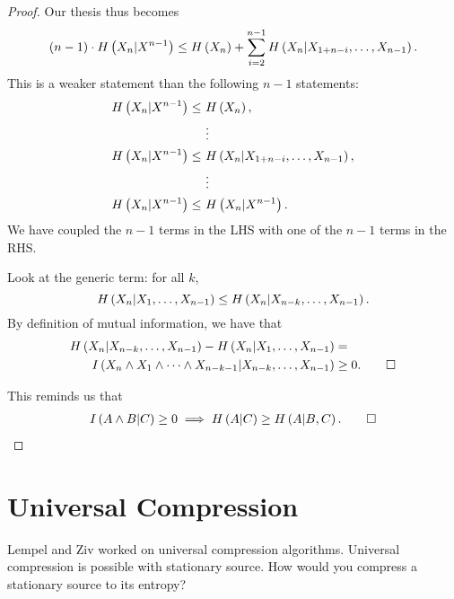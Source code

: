 \begin{proof}
	Our thesis thus becomes
	\begin{equation*}
		(n-1) \cdot H\left({X_n | X^{n-1}}\right)
		\le
		H\left({X_n}\right) + \sum_{i=2}^{n-1} H\left({X_n | X_{1+n-i}, \dots, X_{n-1}}\right).
	\end{equation*}
	This is a weaker statement than the following $n-1$ statements:
	\begin{align*}
		H\left({X_n | X^{n-1}}\right) \le~& H\left({X_n}\right),
		\\
		& \vdots
		\\
		H\left({X_n | X^{n-1}}\right) \le~& H\left({X_n | X_{1+n-i}, \dots, X_{n-1}}\right),
		\\
		& \vdots
		\\
		H\left({X_n | X^{n-1}}\right) \le~& H\left({X_n | X^{n-1}}\right).
	\end{align*}
	We have coupled the $n-1$ terms in the \ac{LHS} with one of the $n-1$ terms in the \ac{RHS}.

	Look at the generic term: for all $k$,
	\begin{equation*}
		H\left({X_n | X_1, \dots, X_{n-1}}\right)
		\le
		H\left({X_n | X_{n-k}, \dots, X_{n-1}}\right).
	\end{equation*}
	By definition of mutual information, we have that
	\begin{align*}
		H\left({X_n | X_{n-k}, \dots, X_{n-1}}\right)
		-
		H\left({X_n | X_1, \dots, X_{n-1}}\right)
		& =
		\\
		I \left( {X_n \land X_1 \land \dots \land X_{n-k-1} | X_{n-k}, \dots, X_{n-1}} \right)
		& \ge 0. \qedhere
	\end{align*}

	This reminds us that
	\begin{align*}
		I \left( {A \land B | C} \right) \ge 0
		\implies
		H\left({A | C}\right) \ge H\left({A | B, C}\right). \qedhere
	\end{align*}
\end{proof}

\section{Universal Compression}

Lempel and Ziv worked on universal compression algorithms.
Universal compression is possible with stationary source.
How would you compress a stationary source to its entropy?

